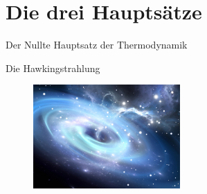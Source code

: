 \documentclass[ngerman,ph]{URbeamer}
\begin{document}
	\section{Die drei Hauptsätze}
	\begin{frame}{Der Nullte Hauptsatz der Thermodynamik}
		\begin{center}
			\Large{Die Hawkingstrahlung} 
		\end{center}
		\begin{figure} [h] 
			\begin{center}
				\includegraphics[width=0.5\textwidth]{Hawkingstrahlung}
			\end{center}
		\end{figure} %
	\end{frame}
	
\end{document}
